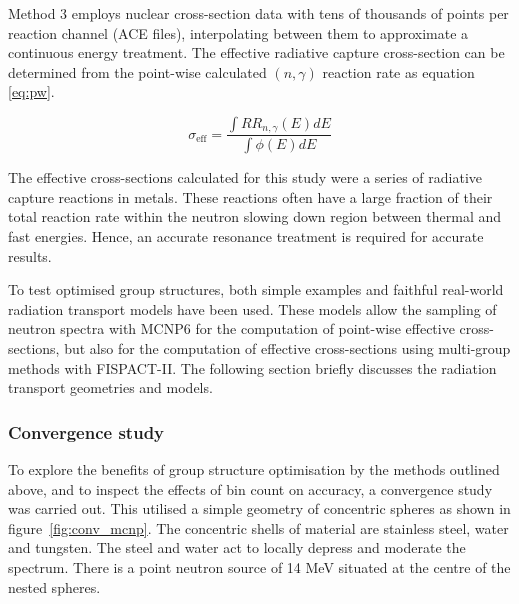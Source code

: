 Method 3 employs nuclear cross-section data with tens of thousands of points per reaction channel (ACE files), interpolating between them to approximate a continuous energy treatment. The effective radiative capture cross-section can be determined from the point-wise calculated $(n,\gamma)$ reaction rate as equation \ref{eq:pw}. 

\begin{equation}
\label{eq:pw}
\sigma_\mathrm{eff} = \frac{\int RR_{n,\gamma}(E) dE}{\int \phi(E) dE}
\end{equation}

The effective cross-sections calculated for this study were a series of radiative capture reactions in metals. These reactions often have a large fraction of their total reaction rate within the neutron slowing down region between thermal and fast energies. Hence, an accurate resonance treatment is required for accurate results. 

To test optimised group structures, both simple examples and faithful real-world radiation transport models have been used. These models allow the sampling of neutron spectra with MCNP6 for the computation of point-wise effective cross-sections, but also for the computation of effective cross-sections using multi-group methods with FISPACT-II. The following section briefly discusses the radiation transport geometries and models.

\subsubsection{Convergence study}
\label{subsubsec:conv}
To explore the benefits of group structure optimisation by the methods outlined above, and to inspect the effects of bin count on accuracy, a convergence study was carried out. This utilised a simple geometry of concentric spheres as shown in figure~\ref{fig:conv_mcnp}. The concentric shells of material are stainless steel, water and tungsten. The steel and water act to locally depress and moderate the spectrum. There is a point neutron source of 14 MeV situated at the centre of the nested spheres. 

